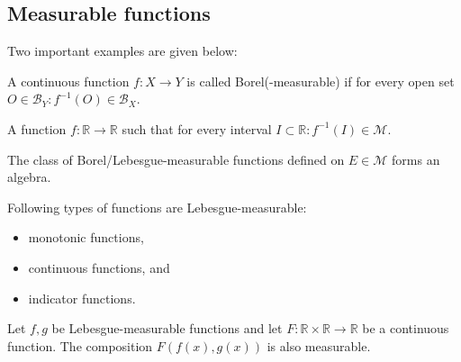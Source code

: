 \subsection{Measurable functions}


    Two important examples are given below:
    \begin{example}\label{lebesgue:borel_measurable_function}
        A continuous function $f:X\rightarrow Y$ is called Borel(-measurable) if for every open set $O\in\mathcal{B}_Y:f^{-1}(O)\in\mathcal{B}_X$.
    \end{example}
    \begin{example}\label{lebesgue:measurable_function}
        A function $f:\mathbb{R}\rightarrow\mathbb{R}$ such that for every interval $I\subset\mathbb{R}:f^{-1}(I)\in\mathcal{M}$.
    \end{example}

    \begin{property}
        The class of Borel/Lebesgue-measurable functions defined on $E\in\mathcal{M}$ forms an algebra.
    \end{property}

    \begin{example}
        Following types of functions are Lebesgue-measurable:
        \begin{itemize}
            \item monotonic functions,
            \item continuous functions, and
            \item indicator functions.
        \end{itemize}
    \end{example}
    \begin{result}
        Let $f,g$ be Lebesgue-measurable functions and let $F:\mathbb{R}\times\mathbb{R}\rightarrow\mathbb{R}$ be a continuous function. The composition $F(f(x),g(x))$ is also measurable.
    \end{result}

